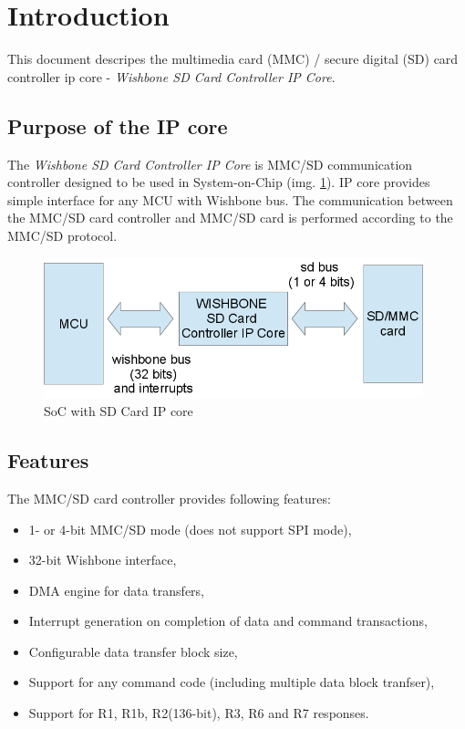 \section{Introduction}
\label{sec:introduction}

    This document descripes the multimedia card (MMC) / secure digital (SD) card controller ip core - \textit{Wishbone SD Card Controller IP Core}.

    \subsection{Purpose of the IP core}
    \label{sec:purpose}

    The \textit{Wishbone SD Card Controller IP Core} is MMC/SD communication controller designed to be used in System-on-Chip (img. \ref{img:ip_core}).
    IP core provides simple interface for any MCU with Wishbone bus. The communication between the MMC/SD card controller and MMC/SD card 
    is performed according to the MMC/SD protocol.
    
    \begin{figure}[H]
        \centering
        \includegraphics[width=11cm]{../bin/ip_core.png}
        \caption{SoC with SD Card IP core}
        \label{img:ip_core}
    \end{figure}
    
    \subsection{Features}
    \label{sec:fetures}
    The MMC/SD card controller provides following features:
    
    \begin{itemize}
     \item 1- or 4-bit MMC/SD mode (does not support SPI mode),
     \item 32-bit Wishbone interface,
     \item DMA engine for data transfers,
     \item Interrupt generation on completion of data and command transactions,
     \item Configurable data transfer block size,
     \item Support for any command code (including multiple data block tranfser),
     \item Support for R1, R1b, R2(136-bit), R3, R6 and R7 responses.
    \end{itemize}
